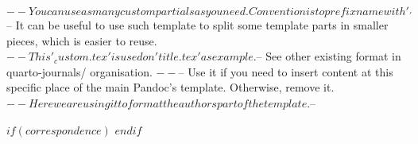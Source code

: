 $-- You can use as many custom partials as you need. Convention is to prefix name with '_'
$-- It can be useful to use such template to split some template parts in smaller pieces, which is easier to reuse. 
$-- This '_custom.tex' is used on 'title.tex' as example.
$-- See other existing format in quarto-journals/ organisation.
$-- %
$-- Use it if you need to insert content at this specific place of the main Pandoc's template. Otherwise, remove it.
$-- Here we are using it to format the authors part of the template.
$-- %


\address{myaffiliation}

$if(correspondence)$
$endif$
